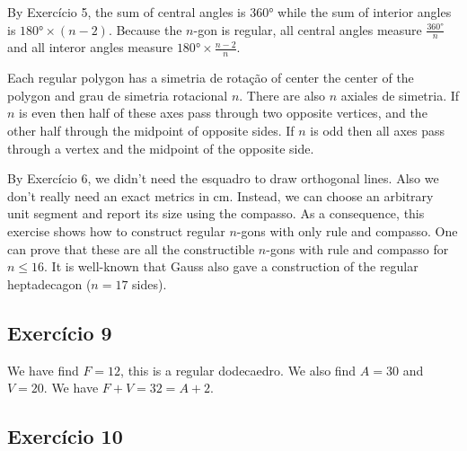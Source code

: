 By Exercício 5, the sum of central angles is $360°$ while the sum
of interior angles is $180° \times {(n-2)}$. Because the $n$-gon is regular,
all central angles measure $\frac{360°}{n}$ and all interor angles
measure $180° \times \frac{n-2}{n}$.

Each regular polygon has a simetria de rotação of center the center of the
polygon and grau de simetria rotacional $n$. There are also $n$ axiales
de simetria. If $n$ is even then half of these axes pass through two opposite vertices, and the other half through the midpoint of opposite sides.
If $n$ is odd then all axes pass through a vertex and the midpoint of the
opposite side.

By Exercício 6, we didn't need the esquadro to draw orthogonal lines. Also
we don't really need an exact metrics in $\text{cm}$. Instead, we can choose
an arbitrary unit segment and report its size using the compasso.
As a consequence, this exercise shows how to construct regular $n$-gons
with only rule and compasso. One can prove that these are all
the constructible $n$-gons with rule and compasso for $n \leq 16$.
It is well-known that Gauss also gave a construction of the regular
heptadecagon ($n=17$ sides).

\subsection*{Exercício 9}

We have find $F=12$, this is a regular dodecaedro. We also find $A=30$ and
$V=20$. We have $F+V=32=A+2$.

\subsection*{Exercício 10}

